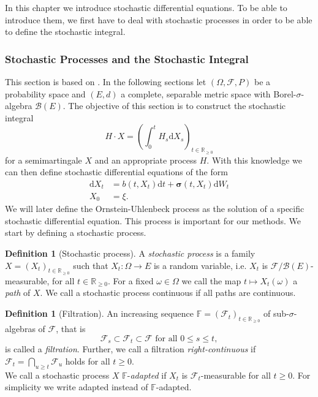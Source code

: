 \documentclass[11pt,titlepage]{article}
\newcommand{\R}{\mathbb{R}} %
\theoremstyle{definition}
\newtheorem{definition}[theorem]{Definition}
\theoremstyle{remark}
\begin{document}
	In this chapter we introduce stochastic differential equations. To be able to introduce them, we first have to deal with stochastic processes in order to be able to define the stochastic integral.
	
	\subsubsection{Stochastic Processes and the Stochastic Integral}
	
	This section is based on \cite{StoProSchmidt2021}. In the following sections let $(\Omega, \mathcal{F}, P)$ be a probability space and $(E, d)$ a complete, separable metric space with 
	Borel-$\sigma$-algebra $\mathcal{B}(E)$. The objective of this section is to construct the stochastic integral 
	\[H\cdot X = \left(\int_0^t H_s \mathrm{d}X_s\right)_{t\in\R_{\geq 0}}\]
	for a semimartingale $X$ and an appropriate process $H$. With this knowledge we can then define stochastic differential equations of the form
	\begin{align*}
		\mathrm{d}X_t &= b(t, X_t)\mathrm{d}t + \boldsymbol{\sigma}(t, X_t)\mathrm{d}W_t \\
		X_0 &= \xi.
	\end{align*}
	We will later define the Ornstein-Uhlenbeck process as the solution of a specific stochastic 
	differential equation. This process is important for our methods. We start by defining a stochastic process.
	
	\begin{definition}[Stochastic process]
		A \textsl{stochastic process} is a family $X = (X_t)_{t\in\R_{\geq 0}}$ such that $X_t:\Omega\to E$ is a random variable, i.e. $X_t$ is $\mathcal{F}/\mathcal{B}(E)$-measurable, for all $t\in\R_{\geq 0}$. For a fixed
		$\omega\in\Omega$ we call the map $t\mapsto X_t(\omega)$ a \textsl{path} of $X$. 
		We call a stochastic process continuous if all paths are continuous.
	\end{definition}

	\begin{definition}[Filtration]
		An increasing sequence $\mathbb{F}=(\mathcal{F}_t)_{t\in\R_{\geq 0}}$ of sub-$\sigma$-algebras 
		of $\mathcal{F}$, that is
		\[\mathcal{F}_s\subset\mathcal{F}_t\subset\mathcal{F}\text{ for all } 0\leq s\leq t,\]
		is called a \textsl{filtration}. 
		Further, we call a filtration \textsl{right-continuous} if $\mathcal{F}_t = \bigcap_{u\geq t}\mathcal{F}_u$ holds for all $t\geq 0$. \\
		We call a stochastic process $X$ $\mathbb{F}$-\textsl{adapted} if $X_t$ is $\mathcal{F}_t$-measurable for all $t\geq 0$. For simplicity we write adapted instead of $\mathbb{F}$-adapted.
	\end{definition}
	
\end{document}

